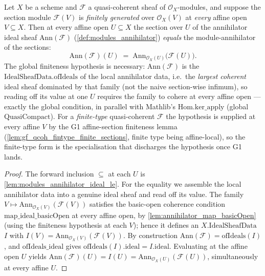 \begin{lemma}
  \label{lem:modules_annihilator_ideal}
  Let \(X\) be a scheme and \(\mathcal{F}\) a quasi-coherent sheaf of \(\mathcal{O}_X\)-modules,
  and suppose the section module \(\mathcal{F}(V)\) is \emph{finitely generated} over
  \(\mathcal{O}_X(V)\) at \emph{every} affine open \(V \subseteq X\). Then at every affine open
  \(U \subseteq X\) the section over \(U\) of the annihilator ideal sheaf
  \(\mathrm{Ann}(\mathcal{F})\) (\cref{def:modules_annihilator}) \emph{equals} the
  module-annihilator of the sections:
  \[
    \mathrm{Ann}(\mathcal{F})(U)
    \;=\; \mathrm{Ann}_{\mathcal{O}_X(U)}\bigl(\mathcal{F}(U)\bigr).
  \]
  The global finiteness hypothesis is necessary: \(\mathrm{Ann}(\mathcal{F})\) is the
  \(\mathrm{IdealSheafData.ofIdeals}\) of the local annihilator data, i.e.\ the \emph{largest
  coherent} ideal sheaf dominated by that family (not the naive section-wise infimum), so reading
  off its value at one \(U\) requires the family to cohere at every affine open — exactly the
  global condition, in parallel with Mathlib's \(\mathrm{Hom.ker\_apply}\) (global
  \(\mathrm{QuasiCompact}\)). For a \emph{finite-type} quasi-coherent \(\mathcal{F}\) the
  hypothesis is supplied at every affine \(V\) by the G1 affine-section finiteness lemma
  (\cref{lem:gf_qcoh_fintype_finite_sections}, finite type being affine-local), so the finite-type
  form is the specialisation that discharges the hypothesis once G1 lands.
\end{lemma}
\begin{proof}
  The forward inclusion \(\subseteq\) at each \(U\) is \cref{lem:modules_annihilator_ideal_le}. For
  the equality we assemble the local annihilator data into a genuine ideal sheaf and read off its
  value. The family \(V \mapsto \mathrm{Ann}_{\mathcal{O}_X(V)}(\mathcal{F}(V))\) satisfies the
  basic-open coherence condition \(\mathrm{map\_ideal\_basicOpen}\) at every affine open, by
  \cref{lem:annihilator_map_basicOpen} (using the finiteness hypothesis at each \(V\)); hence it
  defines an \(X.\mathrm{IdealSheafData}\) \(I\) with \(I(V) = \mathrm{Ann}_{\mathcal{O}_X(V)}(\mathcal{F}(V))\).
  By construction \(\mathrm{Ann}(\mathcal{F}) = \mathrm{ofIdeals}(I)\), and
  \(\mathrm{ofIdeals\_ideal}\) gives \(\mathrm{ofIdeals}(I).\mathrm{ideal} = I.\mathrm{ideal}\).
  Evaluating at the affine open \(U\) yields
  \(\mathrm{Ann}(\mathcal{F})(U) = I(U) = \mathrm{Ann}_{\mathcal{O}_X(U)}(\mathcal{F}(U))\),
  simultaneously at every affine \(U\).
\end{proof}

